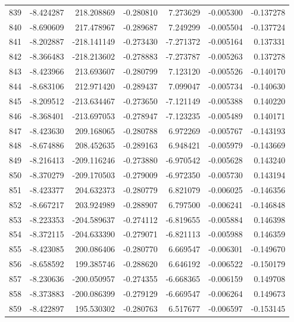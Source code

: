 \begin{tabular}{rrrrrrr}
 839 &  -8.424287 &  218.208869 & -0.280810 &    7.273629 &   -0.005300 & -0.137278 \\
 840 &  -8.690609 &  217.478967 & -0.289687 &    7.249299 &   -0.005504 & -0.137724 \\
 841 &  -8.202887 & -218.141149 & -0.273430 &   -7.271372 &   -0.005164 &  0.137331 \\
 842 &  -8.366483 & -218.213602 & -0.278883 &   -7.273787 &   -0.005263 &  0.137278 \\
 843 &  -8.423966 &  213.693607 & -0.280799 &    7.123120 &   -0.005526 & -0.140170 \\
 844 &  -8.683106 &  212.971420 & -0.289437 &    7.099047 &   -0.005734 & -0.140630 \\
 845 &  -8.209512 & -213.634467 & -0.273650 &   -7.121149 &   -0.005388 &  0.140220 \\
 846 &  -8.368401 & -213.697053 & -0.278947 &   -7.123235 &   -0.005489 &  0.140171 \\
 847 &  -8.423630 &  209.168065 & -0.280788 &    6.972269 &   -0.005767 & -0.143193 \\
 848 &  -8.674886 &  208.452635 & -0.289163 &    6.948421 &   -0.005979 & -0.143669 \\
 849 &  -8.216413 & -209.116246 & -0.273880 &   -6.970542 &   -0.005628 &  0.143240 \\
 850 &  -8.370279 & -209.170503 & -0.279009 &   -6.972350 &   -0.005730 &  0.143194 \\
 851 &  -8.423377 &  204.632373 & -0.280779 &    6.821079 &   -0.006025 & -0.146356 \\
 852 &  -8.667217 &  203.924989 & -0.288907 &    6.797500 &   -0.006241 & -0.146848 \\
 853 &  -8.223353 & -204.589637 & -0.274112 &   -6.819655 &   -0.005884 &  0.146398 \\
 854 &  -8.372115 & -204.633390 & -0.279071 &   -6.821113 &   -0.005988 &  0.146359 \\
 855 &  -8.423085 &  200.086406 & -0.280770 &    6.669547 &   -0.006301 & -0.149670 \\
 856 &  -8.658592 &  199.385746 & -0.288620 &    6.646192 &   -0.006522 & -0.150179 \\
 857 &  -8.230636 & -200.050957 & -0.274355 &   -6.668365 &   -0.006159 &  0.149708 \\
 858 &  -8.373883 & -200.086399 & -0.279129 &   -6.669547 &   -0.006264 &  0.149673 \\
 859 &  -8.422897 &  195.530302 & -0.280763 &    6.517677 &   -0.006597 & -0.153145 \\

\end{tabular}
